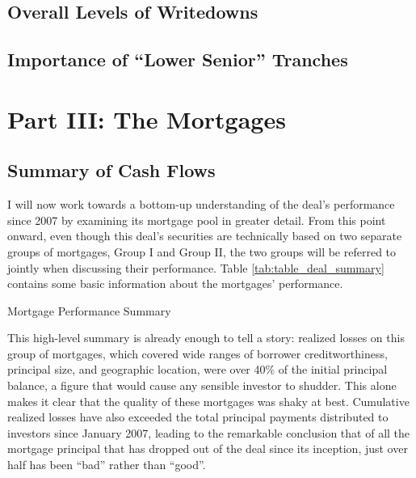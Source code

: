 \documentclass[12pt]{article}
\begin{document}
\subsection*{Overall Levels of Writedowns}

\subsection*{Importance of ``Lower Senior'' Tranches}

\section*{Part III: The Mortgages}
\subsection*{Summary of Cash Flows}

I will now work towards a bottom-up understanding of the deal's performance since 2007 by examining its mortgage pool in greater detail. From this point onward, even though this deal’s securities are technically based on two separate groups of mortgages, Group I and Group II, the two groups will be referred to jointly when discussing their performance. Table \ref{tab:table_deal_summary} contains some basic information about the mortgages’ performance.

\begin{table}[h]
	\centering
	\caption{Mortgage Performance Summary}
	
	
	\label{tab:table_deal_summary}
\end{table}

This high-level summary is already enough to tell a story: realized losses on this group of mortgages, which covered wide ranges of borrower creditworthiness, principal size, and geographic location, were over 40\% of the initial principal balance, a figure that would cause any sensible investor to shudder. This alone makes it clear that the quality of these mortgages was shaky at best. Cumulative realized losses have also exceeded the total principal payments distributed to investors since January 2007, leading to the remarkable conclusion that of all the mortgage principal that has dropped out of the deal since its inception, just over half has been “bad” rather than “good”.
\end{document}
